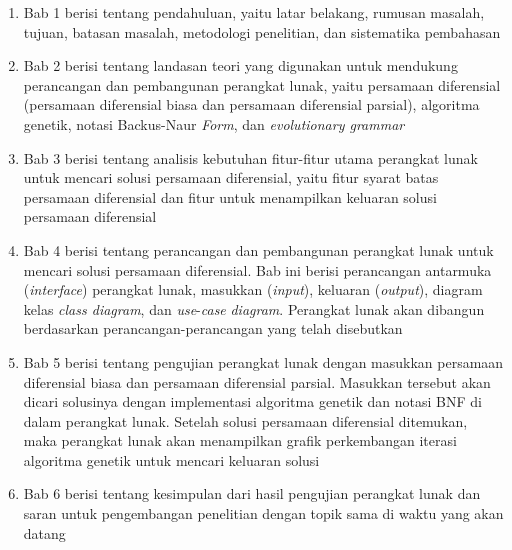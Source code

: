 \begin{enumerate}
 	\item Bab 1 berisi tentang pendahuluan, yaitu latar belakang, rumusan masalah, tujuan, batasan masalah, metodologi penelitian, dan sistematika pembahasan
	\item Bab 2 berisi tentang landasan teori yang digunakan untuk mendukung perancangan dan pembangunan perangkat lunak, yaitu persamaan diferensial (persamaan diferensial biasa dan persamaan diferensial parsial), algoritma genetik, notasi Backus-Naur
	         \textit{Form}, dan \textit{evolutionary grammar}
	\item Bab 3 berisi tentang analisis kebutuhan fitur-fitur utama perangkat lunak untuk mencari solusi persamaan diferensial, yaitu fitur syarat batas persamaan diferensial dan fitur untuk menampilkan keluaran solusi persamaan diferensial
	\item Bab 4 berisi tentang perancangan dan pembangunan perangkat lunak untuk mencari solusi persamaan diferensial. Bab ini berisi perancangan antarmuka (\textit{interface}) perangkat lunak, masukkan (\textit{input}), keluaran (\textit{output}), diagram kelas
                   \textit{class diagram}, dan \textit{use}-\textit{case} \textit{diagram}. Perangkat lunak akan dibangun berdasarkan perancangan-perancangan yang telah disebutkan
	\item Bab 5 berisi tentang pengujian perangkat lunak dengan masukkan persamaan diferensial biasa dan persamaan diferensial parsial. Masukkan tersebut akan dicari solusinya dengan implementasi algoritma genetik dan notasi BNF di dalam perangkat lunak. Setelah
	         solusi persamaan diferensial ditemukan, maka perangkat lunak akan menampilkan grafik perkembangan iterasi algoritma genetik untuk mencari keluaran solusi
	\item Bab 6 berisi tentang kesimpulan dari hasil pengujian perangkat lunak dan saran untuk pengembangan penelitian dengan topik sama di waktu yang akan datang
\end{enumerate}
